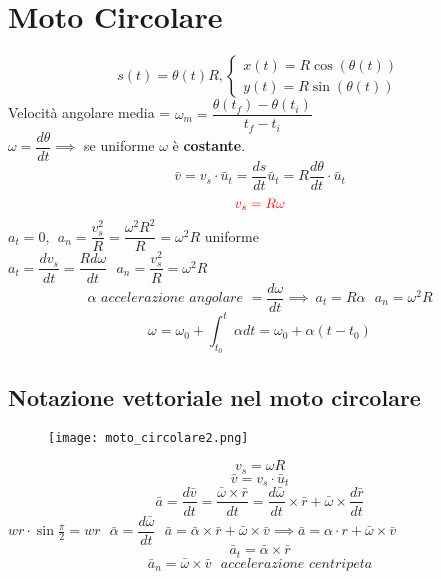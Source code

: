 \documentclass[../../main.tex]{subfiles}
\begin{document}
\section{Moto Circolare}
\[
    s(t) = \theta(t)R , \begin{cases}
        x(t) = R\cos(\theta(t)) \\
        y(t) = R\sin(\theta(t))
    \end{cases}
\]
Velocità angolare media = $\omega_m = \dfrac{\theta(t_f) - \theta(t_i)}{t_f - t_i}$ \\
$\omega = \dfrac{d\theta}{dt} \implies $ se uniforme $\omega$ è \textbf{costante}. \\
\[
    \bar v = v_s\cdot\bar u_t = \dfrac{ds}{dt}\bar u_t = R\dfrac{d\theta}{dt}\cdot\bar{u}_t
\]
\[
    \textcolor{red}{v_s = R\omega}
\]
$
    a_t = 0, \ \ a_n = \dfrac{v^2_s}{R} = \dfrac{\omega^2R^2}{R} = \omega^2R
$ uniforme \\
$
    a_t = \dfrac{dv_s}{dt} = \dfrac{Rd\omega}{dt} \ \ \ a_n = \dfrac{v_s^2}{R} = \omega^2R
$
\[
    \alpha \textit{ accelerazione angolare } = \dfrac{d\omega}{dt} \implies \ a_t = R\alpha \ \ \ a_n = \omega^2R
\]
\[
    \omega = \omega_0 + \int_{t_0}^{t} \alpha dt = \omega_0 + \alpha(t - t_0)
\]
\subsection{Notazione vettoriale nel moto circolare}
\begin{figure}[h!]
    \centering
    \texttt{[image: moto\_circolare2.png]}
\end{figure}
\[
    v_s = \omega R
\]
\[
    \bar{v} = v_s \cdot \bar{u}_t
\]
\[
    \bar a = \dfrac{d\bar v}{dt} = \dfrac{\bar\omega\times\bar r}{dt} = \dfrac{d\bar \omega}{dt}\times\bar r + \bar\omega\times\dfrac{d\bar r}{dt}
\]
$wr\cdot\sin\frac{\pi}{2} = wr \ \ \ \bar\alpha = \dfrac{d\bar\omega}{dt} \ \ \ \bar a = \bar\alpha\times\bar r + \bar\omega\times\bar v \implies \bar a = \alpha\cdot r + \bar\omega\times\bar v$
\[
    \bar a_t = \bar\alpha\times\bar r
\]
\[
    \bar a_n = \bar{\omega}\times\bar v \ \ \ \textit{accelerazione centripeta}
\]
\end{document}
